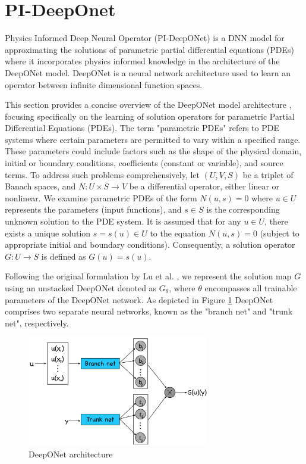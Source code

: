 \documentclass[a4paper,12pt]{article}
\theoremstyle{definition}
\begin{document}
\clearpage
\section{PI-DeepOnet}
Physics Informed Deep Neural Operator (PI-DeepONet) is a DNN model for approximating  
the solutions of parametric partial differential equations (PDEs) where it incorporates 
physics informed knowledge in the architecture of the DeepONet model.
DeepONet is a neural network architecture used to learn
an operator between infinite dimensional function spaces. 

This section provides a concise overview of the DeepONet model architecture \cite{wang2021learning}, 
focusing specifically on the learning of solution operators for parametric Partial Differential Equations
(PDEs). The term "parametric PDEs" refers to PDE systems where certain parameters are permitted to vary 
within a specified range. These parameters could include factors such as the shape of the physical domain,
initial or boundary conditions, coefficients (constant or variable), and source terms. To address such 
problems comprehensively, let $(U, V, S)$ be a triplet of Banach spaces, and $N: U \times S \rightarrow
V$ be a differential operator, either linear or nonlinear. We examine parametric PDEs of the form 
$N(u, s) = 0$ \cite{wang2021learning} where $u \in U$ represents the parameters (input functions),
and $s \in S$ is the corresponding unknown solution to the PDE system. It is assumed that for any
$u \in U$, there exists a unique solution $s = s(u) \in U$ to the equation $N(u, s) = 0$ (subject to
appropriate initial and boundary conditions). Consequently, a solution operator $G: U \rightarrow S$ 
is defined as $G(u) = s(u)$. 

Following the original formulation by Lu et al. \cite{wang2021learning}, 
we represent the solution map $G$ using an unstacked DeepONet denoted as $G_{\theta}$, where $\theta$ 
encompasses all trainable parameters of the DeepONet network. As depicted in Figure \ref{DeepONet architecture}
DeepONet comprises two separate neural networks, known as the "branch net" and "trunk net", respectively.

\begin{figure}
    \centering
    \includegraphics[width=300px]{images/DeepOnet.png}
    \caption{DeepONet architecture}
    \label{DeepONet architecture}
\end{figure}
\end{document}
